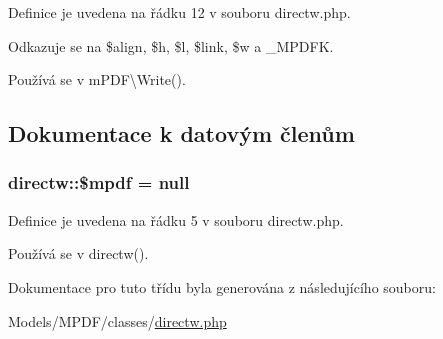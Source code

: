 Definice je uvedena na řádku 12 v souboru directw.\-php.



Odkazuje se na \$align, \$h, \$l, \$link, \$w a \-\_\-\-M\-P\-D\-F\-K.



Používá se v m\-P\-D\-F\textbackslash{}\-Write().



\subsection{Dokumentace k datovým členům}
\hypertarget{classdirectw_a4b3fd8aff0032fa8a2e36999527ef445}{
\subsubsection[{\$mpdf}]{\setlength{\rightskip}{0pt plus 5cm}directw\-::\$mpdf = null}}\label{classdirectw_a4b3fd8aff0032fa8a2e36999527ef445}


Definice je uvedena na řádku 5 v souboru directw.\-php.



Používá se v directw().



Dokumentace pro tuto třídu byla generována z následujícího souboru\-:\begin{DoxyCompactItemize}
\item 
Models/\-M\-P\-D\-F/classes/\hyperlink{directw_8php}{directw.\-php}\end{DoxyCompactItemize}
